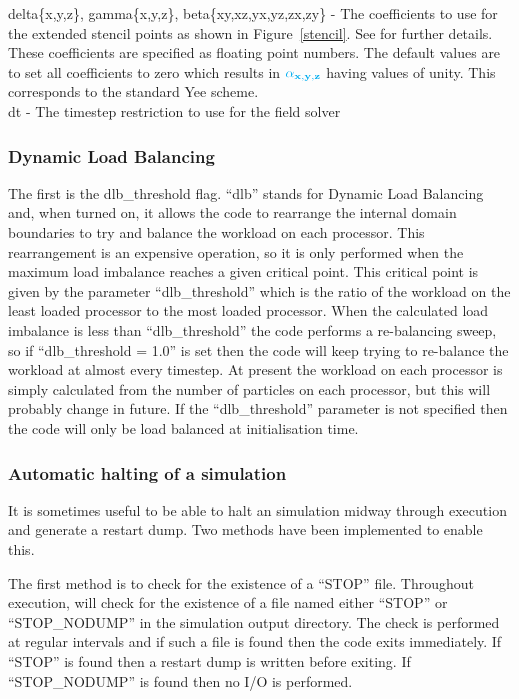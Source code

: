 {\emphtext delta\{x,y,z\}, gamma\{x,y,z\}, beta\{xy,xz,yx,yz,zx,zy\}} -
  The coefficients to use for the extended stencil points as shown in
  Figure~\ref{stencil}. See \citet{Blinne2017} for further details. These
  coefficients are specified as floating point numbers. The default values
  are to set all coefficients to zero which results in
  $\inlineemph{\alpha_{x,y,z}}$ having values of unity. This corresponds to
  the standard Yee scheme.\\

{\emphtext dt} - The timestep restriction to use for the field solver\\


\subsubsection{Dynamic Load Balancing}
The first is the {\emphtext dlb\_threshold} flag.
``dlb'' stands for Dynamic Load Balancing and, when turned on, it allows the
code to rearrange the internal domain boundaries to try and balance the
workload on each processor. This rearrangement is an expensive operation, so
it is only performed when the maximum load imbalance reaches a given critical
point. This critical point is given by the parameter ``dlb\_threshold'' which
is the ratio of the workload on the least loaded processor to the most loaded
processor. When the calculated load imbalance is less than ``dlb\_threshold''
the code performs a re-balancing sweep, so if ``dlb\_threshold = 1.0'' is set
then the code will keep trying to re-balance the workload at almost every
timestep. At present the workload on each processor is simply calculated from
the number of particles on each processor, but this will probably change in
future. If the ``dlb\_threshold'' parameter is not specified then the code
will only be load balanced at initialisation time.

\subsubsection{Automatic halting of a simulation}
It is sometimes useful to be able to halt an {\EPOCH} simulation midway through
execution and generate a restart dump. Two methods have been implemented to
enable this.

The first method is to check for the existence of a ``STOP'' file. Throughout
execution, {\EPOCH} will check for the existence of a file named either
``STOP'' or ``STOP\_NODUMP'' in the simulation output directory. The check is
performed at regular intervals and if such a file is found then the code
exits immediately. If ``STOP'' is found then a restart dump is written before
exiting. If ``STOP\_NODUMP'' is found then no I/O is performed.


